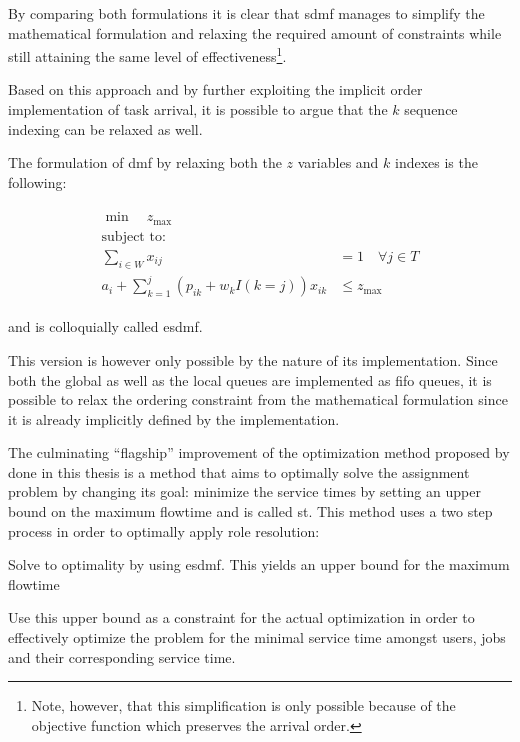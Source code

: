 By comparing both formulations it is clear that \gls{sdmf} manages to simplify the mathematical formulation and relaxing the required amount of constraints while still attaining the same level of effectiveness\footnote{Note, however, that this simplification is only possible because of the objective function which preserves the arrival order.}. 

Based on this approach and by further exploiting the implicit order implementation of task arrival, it is possible to argue that the $k$ sequence indexing can be relaxed as well.

The formulation of \gls{dmf} by relaxing both the $z$ variables and $k$ indexes is the following:

\begin{align}
	\begin{split}
	    \min \quad z_{\text{max}}\\
	    \text{subject to:} \\
	    \sum_{i \in W} x_{ij} &= 1 \quad \forall j \in T\\
	    a_i + \sum_{k=1}^j (p_{ik} + w_k I(k=j))x_{ik} &\leq z_{\text{max}}
	\end{split}
\end{align}

and is colloquially called \gls{esdmf}.

This version is however only possible by the nature of its implementation. Since both the global as well as the local queues are implemented as \gls{fifo} queues, it is possible to relax the ordering constraint from the mathematical formulation since it is already implicitly defined by the implementation.

The culminating ``flagship'' improvement of the optimization method proposed by \citet{Zeng2005} done in this thesis is a method that aims to optimally solve the assignment problem by changing its goal: minimize the service times by setting an upper bound on the maximum flowtime and is called \gls{st}. This method uses a two step process in order to optimally apply role resolution:
\begin{enumerate*}
	\item Solve to optimality by using \gls{esdmf}. This yields an upper bound for the maximum flowtime
	\item Use this upper bound as a constraint for the actual optimization in order to effectively optimize the problem for the minimal service time amongst users, jobs and their corresponding service time.
\end{enumerate*}

